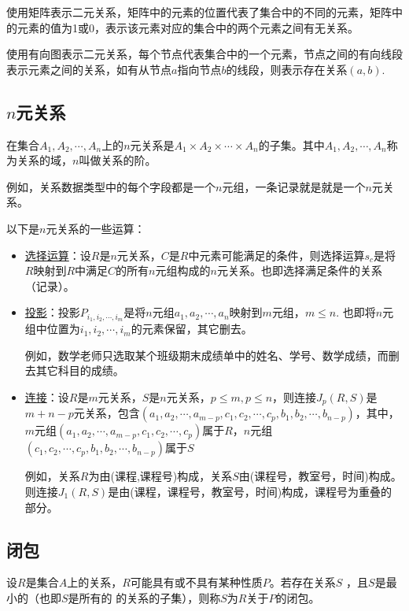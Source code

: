 使用矩阵表示二元关系，矩阵中的元素的位置代表了集合中的不同的元素，矩阵中的元素的值为1或0，表示该元素对应的集合中的两个元素之间有无关系。

使用有向图表示二元关系，每个节点代表集合中的一个元素，节点之间的有向线段表示元素之间的关系，如有从节点$a$指向节点$b$的线段，则表示存在关系$(a,b)$.

\subsection{$n$元关系}
在集合$A_1, A_2, \cdots, A_n$上的$n$元关系是$A_1 \times A_2 \times \cdots \times A_n$的子集。其中$A_1, A_2, \cdots, A_n$称为关系的域，$n$叫做关系的阶。

例如，关系数据类型中的每个字段都是一个$n$元组，一条记录就是就是一个$n$元关系。

以下是$n$元关系的一些运算：
\begin{itemize}
    \item \uline{选择运算}：设$R$是$n$元关系，$C$是$R$中元素可能满足的条件，则选择运算$s_c$是将$R$映射到$R$中满足$C$的所有$n$元组构成的$n$元关系。也即选择满足条件的关系（记录）。

    \item \uline{投影}：投影$P_{i_1, i_2, \cdots, i_m}$是将$n$元组$a_1,a_2,\cdots,a_n$映射到$m$元组，$m \le n$. 也即将$n$元组中位置为$i_1, i_2, \cdots, i_m$的元素保留，其它删去。

    例如，数学老师只选取某个班级期末成绩单中的姓名、学号、数学成绩，而删去其它科目的成绩。

    \item \uline{连接}：设$R$是$m$元关系，$S$是$n$元关系，$p \le m, p \le n$，则连接$J_p(R,S)$是$m + n - p$元关系，包含$(a_1, a_2, \cdots, a_{m-p}, c_1, c_2, \cdots, c_p, b_1, b_2, \cdots, b_{n-p})$，其中，$m$元组$(a_1, a_2, \cdots, a_{m-p}, c_1, c_2, \cdots, c_p)$属于$R$，$n$元组$(c_1, c_2, \cdots, c_p, b_1, b_2, \cdots, b_{n-p})$属于$S$

    例如，关系$R$为由(课程,课程号)构成，关系$S$由(课程号，教室号，时间)构成。则连接$J_1(R,S)$是由(课程，课程号，教室号，时间)构成，课程号为重叠的部分。
\end{itemize}

\subsection{闭包}
设$R$是集合$A$上的关系，$R$可能具有或不具有某种性质$P$。若存在关系$S$  ，且$S$是最小的（也即$S$是所有的  的关系的子集），则称$S$为$R$关于$P$的闭包。


